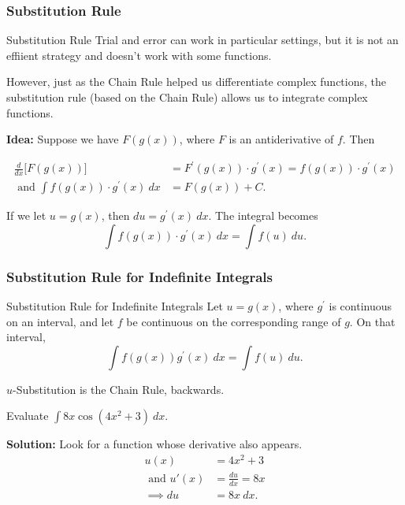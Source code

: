 \documentclass[cal1spr16Lectures.tex]{subfiles}
\begin{document}
\subsubsection{Substitution Rule}

\begin{frame}{\small Substitution Rule}
Trial and error can work in particular settings, but it is not an effiient strategy and doesn't work with some functions.

\vspace{0.5pc}
However, just as the Chain Rule helped us differentiate complex functions, the substitution rule (based on the Chain Rule) allows us to integrate complex functions.
\end{frame}

\begin{frame}\small
{\bf Idea:}  Suppose we have $F(g(x))$, where $F$ is an antiderivative of $f$.  Then

\vspace{-2.5pc}
\begin{align*}
\frac{d}{dx} \bigg[F(g(x)) \bigg] &= F^{\prime}(g(x)) \cdot g^{\prime}(x) = f(g(x)) \cdot g^{\prime}(x) \\
\text{ and }\int f(g(x)) \cdot g^{\prime}(x)\ dx &= F(g(x))+C.
\end{align*}

\vspace{1pc}
If we let $u=g(x)$, then $du=g^{\prime}(x)\ dx$.  The integral becomes
\[\int f(g(x)) \cdot g^{\prime}(x)\ dx = \int f(u)\ du.\]
\end{frame}

\subsubsection{Substitution Rule for Indefinite Integrals}

\begin{frame}{\small Substitution Rule for Indefinite Integrals}
\small
Let $u=g(x)$, where $g^{\prime}$ is continuous on an interval, and let $f$ be continuous on the corresponding range of $g$.  On that interval,
\[\int f(g(x)) g^{\prime}(x)\ dx = \int f(u)\ du.\]

\vspace{1pc}
\alert{$u$-Substitution is the Chain Rule, backwards.}
\end{frame}

\begin{frame}{}\small
\begin{ex} 
Evaluate $\int 8x \cos(4x^2 + 3)\ dx.$ 
\end{ex}

\vspace{1pc}
{\bf Solution:} Look for a function whose derivative also appears.
\begin{align*}
u(x) &=4x^2+3 \\
\text{ and }u'(x) &= \frac{du}{dx} = 8x \\[0.5pc]
\implies du &= 8x\ dx.
\end{align*}
\end{frame}
\end{document}

